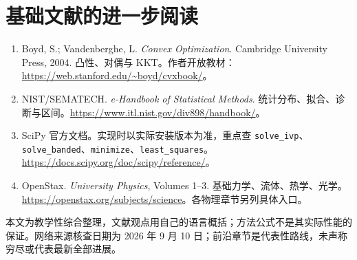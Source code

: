 \documentclass[UTF8,zihao=-4,openany,oneside,fontset=windows]{ctexbook}
\begin{document}
\section{基础文献的进一步阅读}
\begin{enumerate}
\item Boyd, S.; Vandenberghe, L. \emph{Convex Optimization}. Cambridge University Press, 2004. 凸性、对偶与 KKT。作者开放教材：\url{https://web.stanford.edu/~boyd/cvxbook/}。
\item NIST/SEMATECH. \emph{e-Handbook of Statistical Methods}. 统计分布、拟合、诊断与区间。\url{https://www.itl.nist.gov/div898/handbook/}。
\item SciPy 官方文档。实现时以实际安装版本为准，重点查 \texttt{solve\_ivp}、\texttt{solve\_banded}、\texttt{minimize}、\texttt{least\_squares}。\url{https://docs.scipy.org/doc/scipy/reference/}。
\item OpenStax. \emph{University Physics}, Volumes 1--3. 基础力学、流体、热学、光学。\url{https://openstax.org/subjects/science}。各物理章节另列具体入口。
\end{enumerate}
本文为教学性综合整理，文献观点用自己的语言概括；方法公式不是其实际性能的保证。网络来源核查日期为 2026 年 9 月 10 日；前沿章节是代表性路线，未声称穷尽或代表最新全部进展。
\end{document}
